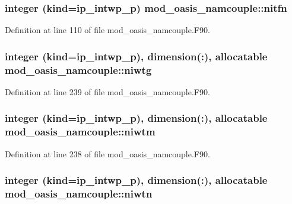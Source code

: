 \hypertarget{classmod__oasis__namcouple_a1e5b5efd046e5ab959fba026bd645945}{
\subsubsection[{nitfn}]{\setlength{\rightskip}{0pt plus 5cm}integer (kind=ip\+\_\+intwp\+\_\+p) mod\+\_\+oasis\+\_\+namcouple\+::nitfn\hspace{0.3cm}{\ttfamily [private]}}}\label{classmod__oasis__namcouple_a1e5b5efd046e5ab959fba026bd645945}


Definition at line 110 of file mod\+\_\+oasis\+\_\+namcouple.\+F90.

\hypertarget{classmod__oasis__namcouple_a28e887d61cc4b10c00c33a7d0f51a275}{
\subsubsection[{niwtg}]{\setlength{\rightskip}{0pt plus 5cm}integer (kind=ip\+\_\+intwp\+\_\+p), dimension(\+:), allocatable mod\+\_\+oasis\+\_\+namcouple\+::niwtg\hspace{0.3cm}{\ttfamily [private]}}}\label{classmod__oasis__namcouple_a28e887d61cc4b10c00c33a7d0f51a275}


Definition at line 239 of file mod\+\_\+oasis\+\_\+namcouple.\+F90.

\hypertarget{classmod__oasis__namcouple_a90e4ce86f77bf89c71a9277ff9b5dcbb}{
\subsubsection[{niwtm}]{\setlength{\rightskip}{0pt plus 5cm}integer (kind=ip\+\_\+intwp\+\_\+p), dimension(\+:), allocatable mod\+\_\+oasis\+\_\+namcouple\+::niwtm\hspace{0.3cm}{\ttfamily [private]}}}\label{classmod__oasis__namcouple_a90e4ce86f77bf89c71a9277ff9b5dcbb}


Definition at line 238 of file mod\+\_\+oasis\+\_\+namcouple.\+F90.

\hypertarget{classmod__oasis__namcouple_a63c2f2977f9cc4839f6bdec7bbbc5fa7}{
\subsubsection[{niwtn}]{\setlength{\rightskip}{0pt plus 5cm}integer (kind=ip\+\_\+intwp\+\_\+p), dimension(\+:), allocatable mod\+\_\+oasis\+\_\+namcouple\+::niwtn\hspace{0.3cm}{\ttfamily [private]}}}\label{classmod__oasis__namcouple_a63c2f2977f9cc4839f6bdec7bbbc5fa7}


